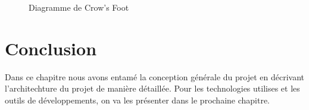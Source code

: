\begin{figure}[H]
	\caption{\label{fig:my-label} Diagramme de Crow's Foot}
\end{figure}

\section{Conclusion}

Dans ce chapitre nous avons entam\'e la conception g\'en\'erale du projet en d\'ecrivant l'architechture du projet de mani\`ere d\'etaill\'ee. Pour les technologies utilises et les outils de d\'eveloppements, on va les pr\'esenter dans le prochaine chapitre.

